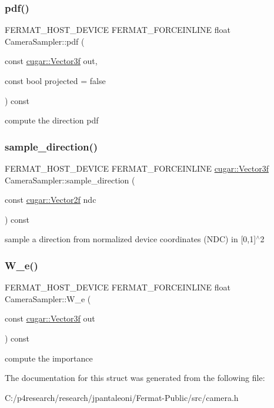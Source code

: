 \subsubsection{\texorpdfstring{pdf()}{pdf()}}
{\footnotesize\ttfamily F\+E\+R\+M\+A\+T\+\_\+\+H\+O\+S\+T\+\_\+\+D\+E\+V\+I\+CE F\+E\+R\+M\+A\+T\+\_\+\+F\+O\+R\+C\+E\+I\+N\+L\+I\+NE float Camera\+Sampler\+::pdf (\begin{DoxyParamCaption}\item[{const \hyperlink{structcugar_1_1_vector}{cugar\+::\+Vector3f}}]{out,  }\item[{const bool}]{projected = {\ttfamily false} }\end{DoxyParamCaption}) const\hspace{0.3cm}{\ttfamily [inline]}}

compute the direction pdf \mbox{\label{struct_camera_sampler_ac502e1699c99c595b773b1419225fe32}} 
\subsubsection{\texorpdfstring{sample\+\_\+direction()}{sample\_direction()}}
{\footnotesize\ttfamily F\+E\+R\+M\+A\+T\+\_\+\+H\+O\+S\+T\+\_\+\+D\+E\+V\+I\+CE F\+E\+R\+M\+A\+T\+\_\+\+F\+O\+R\+C\+E\+I\+N\+L\+I\+NE \hyperlink{structcugar_1_1_vector}{cugar\+::\+Vector3f} Camera\+Sampler\+::sample\+\_\+direction (\begin{DoxyParamCaption}\item[{const \hyperlink{structcugar_1_1_vector}{cugar\+::\+Vector2f}}]{ndc }\end{DoxyParamCaption}) const\hspace{0.3cm}{\ttfamily [inline]}}

sample a direction from normalized device coordinates (N\+DC) in \mbox{[}0,1\mbox{]}$^\wedge$2 \mbox{\label{struct_camera_sampler_afe4852bed67331cf757518e046d82ef1}} 
\subsubsection{\texorpdfstring{W\+\_\+e()}{W\_e()}}
{\footnotesize\ttfamily F\+E\+R\+M\+A\+T\+\_\+\+H\+O\+S\+T\+\_\+\+D\+E\+V\+I\+CE F\+E\+R\+M\+A\+T\+\_\+\+F\+O\+R\+C\+E\+I\+N\+L\+I\+NE float Camera\+Sampler\+::\+W\+\_\+e (\begin{DoxyParamCaption}\item[{const \hyperlink{structcugar_1_1_vector}{cugar\+::\+Vector3f}}]{out }\end{DoxyParamCaption}) const\hspace{0.3cm}{\ttfamily [inline]}}

compute the importance 

The documentation for this struct was generated from the following file\+:\begin{DoxyCompactItemize}
\item 
C\+:/p4research/research/jpantaleoni/\+Fermat-\/\+Public/src/camera.\+h\end{DoxyCompactItemize}
